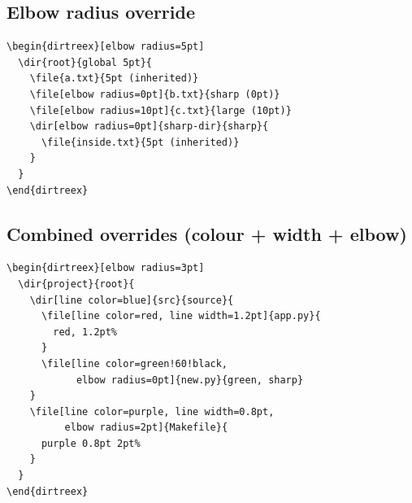 \documentclass[11pt]{article}
\begin{document}
\begin{dirtreex}
\end{dirtreex}

\subsection{Elbow radius override}

\begin{Verbatim}
\begin{dirtreex}[elbow radius=5pt]
  \dir{root}{global 5pt}{
    \file{a.txt}{5pt (inherited)}
    \file[elbow radius=0pt]{b.txt}{sharp (0pt)}
    \file[elbow radius=10pt]{c.txt}{large (10pt)}
    \dir[elbow radius=0pt]{sharp-dir}{sharp}{
      \file{inside.txt}{5pt (inherited)}
    }
  }
\end{dirtreex}
\end{Verbatim}

\begin{dirtreex}[elbow radius=5pt]
\end{dirtreex}

\subsection{Combined overrides (colour + width + elbow)}

\begin{Verbatim}
\begin{dirtreex}[elbow radius=3pt]
  \dir{project}{root}{
    \dir[line color=blue]{src}{source}{
      \file[line color=red, line width=1.2pt]{app.py}{
        red, 1.2pt%
      }
      \file[line color=green!60!black,
            elbow radius=0pt]{new.py}{green, sharp}
    }
    \file[line color=purple, line width=0.8pt,
          elbow radius=2pt]{Makefile}{
      purple 0.8pt 2pt%
    }
  }
\end{dirtreex}
\end{Verbatim}

\begin{dirtreex}[elbow radius=3pt]
\end{dirtreex}
\end{document}
